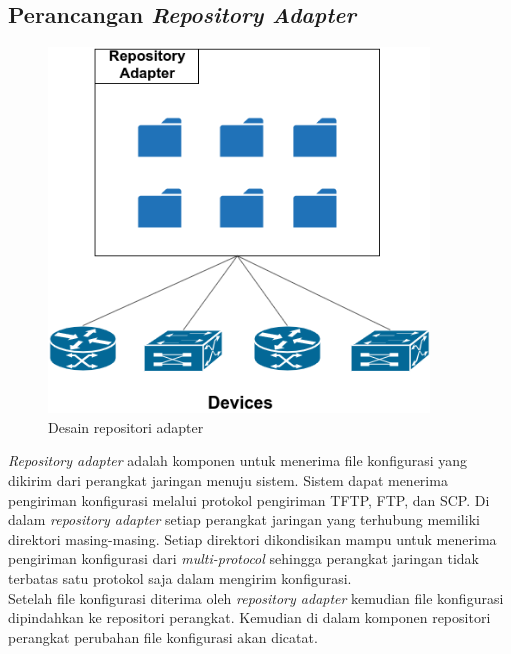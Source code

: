                 
		\subsection{Perancangan \textit{Repository Adapter} }
			\begin{figure}[H]
				\centering
				\includegraphics[width=0.9\textwidth]{Images/C-3/Repository-Adapter.png}
				\caption{Desain repositori adapter}
				\label{DesainRepositoriadapter}
			\end{figure}
			\textit{Repository adapter} adalah komponen untuk menerima file konfigurasi yang dikirim dari perangkat jaringan menuju sistem. Sistem dapat menerima pengiriman konfigurasi melalui protokol pengiriman TFTP, FTP, dan SCP. Di dalam \textit{repository adapter} setiap perangkat jaringan yang terhubung memiliki direktori masing-masing. Setiap direktori dikondisikan mampu untuk menerima pengiriman konfigurasi dari \textit{multi-protocol} sehingga perangkat jaringan tidak terbatas satu protokol saja dalam mengirim konfigurasi.\\
			\indent Setelah file konfigurasi diterima oleh \textit{repository adapter} kemudian file konfigurasi dipindahkan ke repositori perangkat. Kemudian di dalam komponen repositori perangkat perubahan file konfigurasi akan dicatat.
			
